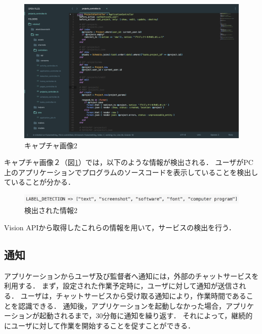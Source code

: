\clearpage

\begin{figure}[h]
  \begin{center}
  \includegraphics[width=14.0cm]{graphics/screenshot02.png}
  \caption{キャプチャ画像2}
  \label{fig:screenshot02}
  \end{center}
\end{figure}

キャプチャ画像２（図\ref{fig:screenshot02}）では，以下のような情報が検出される．
ユーザがPC上のアプリケーションでプログラムのソースコードを表示していることを検出していることが分かる．

\begin{figure}[h]
  \begin{center}
  \includegraphics[width=14.0cm]{graphics/response02.png}
  \caption{検出された情報2}
  \label{fig:response02}
  \end{center}
\end{figure}

Vision APIから取得したこれらの情報を用いて，サービスの検出を行う．

\subsection{通知}
アプリケーションからユーザ及び監督者へ通知には，外部のチャットサービスを利用する．
まず，設定された作業予定時に，ユーザに対して通知が送信される．
ユーザは，チャットサービスから受け取る通知により，作業時間であることを認識できる．
通知後，アプリケーションを起動しなかった場合，アプリケーションが起動されるまで，30分毎に通知を繰り返す．
それによって，継続的にユーザに対して作業を開始することを促すことができる．

